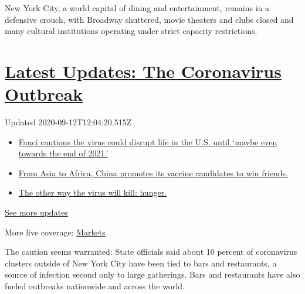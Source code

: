 New York City, a world capital of dining and entertainment, remains in a
defensive crouch, with Broadway shuttered, movie theaters and clubs
closed and many cultural institutions operating under strict capacity
restrictions.

\hypertarget{latest-updates-the-coronavirus-outbreak}{%
\section{\texorpdfstring{\href{https://www.nytimes3xbfgragh.onion/2020/09/11/world/covid-19-coronavirus.html?action=click\&pgtype=Article\&state=default\&region=MAIN_CONTENT_1\&context=storylines_live_updates}{Latest
Updates: The Coronavirus
Outbreak}}{Latest Updates: The Coronavirus Outbreak}}\label{latest-updates-the-coronavirus-outbreak}}

Updated 2020-09-12T12:04:20.515Z

\begin{itemize}
\tightlist
\item
  \href{https://www.nytimes3xbfgragh.onion/2020/09/11/world/covid-19-coronavirus.html?action=click\&pgtype=Article\&state=default\&region=MAIN_CONTENT_1\&context=storylines_live_updates\#link-dfb8a16}{Fauci
  cautions the virus could disrupt life in the U.S. until `maybe even
  towards the end of 2021.'}
\item
  \href{https://www.nytimes3xbfgragh.onion/2020/09/11/world/covid-19-coronavirus.html?action=click\&pgtype=Article\&state=default\&region=MAIN_CONTENT_1\&context=storylines_live_updates\#link-7104d154}{From
  Asia to Africa, China promotes its vaccine candidates to win friends.}
\item
  \href{https://www.nytimes3xbfgragh.onion/2020/09/11/world/covid-19-coronavirus.html?action=click\&pgtype=Article\&state=default\&region=MAIN_CONTENT_1\&context=storylines_live_updates\#link-393ad215}{The
  other way the virus will kill: hunger.}
\end{itemize}

\href{https://www.nytimes3xbfgragh.onion/2020/09/11/world/covid-19-coronavirus.html?action=click\&pgtype=Article\&state=default\&region=MAIN_CONTENT_1\&context=storylines_live_updates}{See
more updates}

More live coverage:
\href{https://www.nytimes3xbfgragh.onion/live/2020/09/11/business/stock-market-today-coronavirus?action=click\&pgtype=Article\&state=default\&region=MAIN_CONTENT_1\&context=storylines_live_updates}{Markets}

The caution seems warranted: State officials said about 10 percent of
coronavirus clusters outside of New York City have been tied to bars and
restaurants, a source of infection second only to large gatherings. Bars
and restaurants have also fueled outbreaks nationwide and across the
world.

